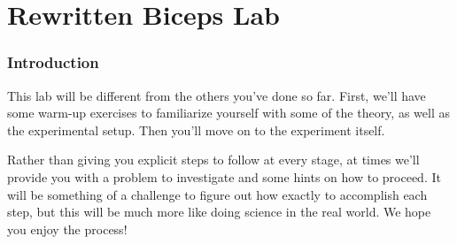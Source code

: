 \documentclass[11pt,letterpaper]{article}
\newcommand{\TODO}[2][inline,color=green!40,caption={}]{{ \todo[#1]{#2} }}
\newcommand{\question}[2][blue]{\textcolor{#1}{#2}}
\newcommand{\answer}[2][red]{\textcolor{#1}{#2}}
\newcommand{\itm}[2][\\ * ]{#1#2}
\renewcommand{\question}[2][]{#2}
\renewcommand{\answer}[2][]{}
\renewcommand{\TODO}[2][]{}
\begin{document}

\vspace{-5ex}
\part*{Rewritten Biceps Lab}
\TODO{
	LEGEND:\\
	* [Black text] -- Regular text \\
	* \question{Question or action the students need to take
		(Mostly for ease of instructor understanding)} \\
	* \answer{Tip for TAs or answer to student question.  
	Will be removed from student version of the lab.}
	\\
	* [These green or orange boxes]
	-- comments on what needs to be done, etc.  
Not part of the lab for students.
}


\TODO{Overall TODO list:  (In addition to items scattered throughout the text)
	\itm {{\bf Just tell them the model is linear}}
}


\begin{comment}
{{{
\TODO{Some notes on word choice:\\
	{\bf Still deciding}
	\itm Experimental parameters
	\itm Parameters vs coefficients in equations
	\itm Formula vs equation vs function
	\itm Apparatus vs experimental setup
	\itm Real world situation vs application vs ?
	\\
	{\bf Decided upon (though subject to discussion)}
	\itm `Model' will always refer to a mathematical model.
	Distinguish between experimental models [experimentally determined models]
	and theoretical models
	\itm Vertical intercept, vs y-intercept or B-intercept
}
}}}
\end{comment}


\section*{Introduction}

This lab will be different from the others you've done so far.
First, we'll have some warm-up exercises to familiarize yourself 
with some of the theory, as well as the experimental setup.
Then you'll move on to the experiment itself.

Rather than giving you explicit steps to follow at every stage,
at times we'll provide you with a problem to investigate
and some hints on how to proceed.  
It will be something of a challenge to figure out how exactly to accomplish
each step, but this will be much more like doing science in the real world.
We hope you enjoy the process!
\end{document}
